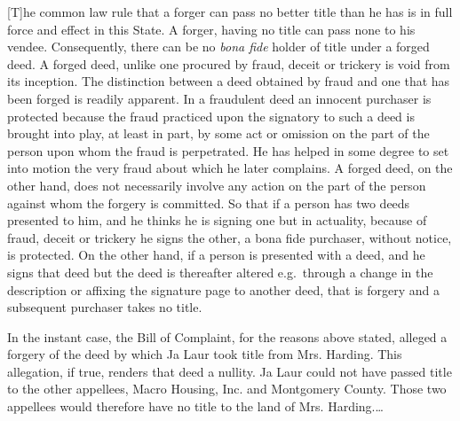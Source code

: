 [T]he common law rule that a forger can pass no better title than he has is in
full force and effect in this State. A forger, having no title can pass none to
his vendee. Consequently, there can be no \textit{bona fide} holder of title
under a forged deed. A forged deed, unlike one procured by fraud, deceit or
trickery is void from its inception. The distinction between a deed obtained by
fraud and one that has been forged is readily apparent. In a fraudulent deed an
innocent purchaser is protected because the fraud practiced upon the signatory
to such a deed is brought into play, at least in part, by some act or omission
on the part of the person upon whom the fraud is perpetrated. He has helped in
some degree to set into motion the very fraud about which he later complains. A
forged deed, on the other hand, does not necessarily involve any action on the
part of the person against whom the forgery is committed. So that if a person
has two deeds presented to him, and he thinks he is signing one but in
actuality, because of fraud, deceit or trickery he signs the other, a bona fide
purchaser, without notice, is protected. On the other hand, if a person is
presented with a deed, and he signs that deed but the deed is thereafter
altered e.g.\ through a change in the description or affixing the signature page
to another deed, that is forgery and a subsequent purchaser takes no title. 

In the instant case, the Bill of Complaint, for the reasons above stated,
alleged a forgery of the deed by which Ja Laur took title from Mrs. Harding.
This allegation, if true, renders that deed a nullity. Ja Laur could not have
passed title to the other appellees, Macro Housing, Inc. and Montgomery County.
Those two appellees would therefore have no title to the land of Mrs.
Harding.\ldots

